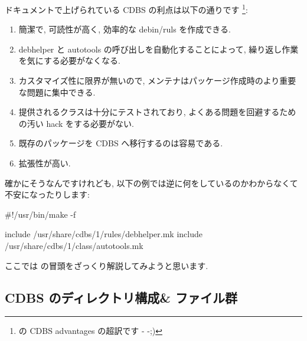 \documentclass[mingoth,a4paper]{jsarticle}
\begin{document}
ドキュメントで上げられている CDBS の利点は以下の通りです%
\footnote{%
\cite{CDBS doc} の CDBS advantages の超訳です - -;)
}:
\begin{enumerate}
    \item 簡潔で, 可読性が高く, 効率的な debin/ruls を作成できる.
    \item debhelper と autotools の呼び出しを自動化することによって,
          繰り返し作業を気にする必要がなくなる.
    \item カスタマイズ性に限界が無いので,
          メンテナはパッケージ作成時のより重要な問題に集中できる.
    \item 提供されるクラスは十分にテストされており,
          よくある問題を回避するための汚い hack をする必要がない.
    \item 既存のパッケージを CDBS へ移行するのは容易である.
    \item 拡張性が高い.
\end{enumerate}
確かにそうなんですけれども, 
以下の例では逆に何をしているのかわからなくて不安になったりします:
\begin{commandline}
#!/usr/bin/make -f
                                
include /usr/share/cdbs/1/rules/debhelper.mk
include /usr/share/cdbs/1/class/autotools.mk
\end{commandline}

ここでは \cite{CDBS doc} の冒頭をざっくり解説してみようと思います.

\subsection{CDBS のディレクトリ構成\& ファイル群}
\end{document}
